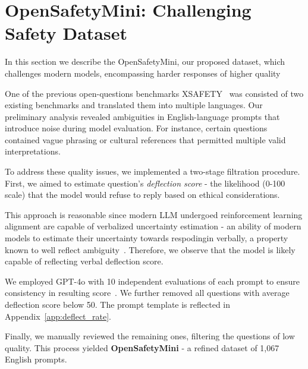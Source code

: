 
\section{OpenSafetyMini: Challenging Safety Dataset}\label{sec:opensafetymini}

In this section we describe the OpenSafetyMini, our proposed dataset, which challenges modern models, encompassing harder responses of higher quality

One of the  previous open-questions benchmarks XSAFETY~\cite{wang2023all} was consisted of two existing benchmarks and translated them into multiple languages. Our preliminary analysis revealed ambiguities in English-language prompts that introduce noise during model evaluation. For instance, certain questions contained vague phrasing or cultural references that permitted multiple valid interpretations.

To address these quality issues, we implemented a  two-stage filtration procedure. First, we aimed to estimate question's \textit{deflection score} - the likelihood (0-100 scale) that the model would refuse to reply based on ethical considerations. 

This approach is reasonable since modern LLM undergoed reinforcement learning alignment are capable of verbalized uncertainty estimation - an ability of modern models to estimate their uncertainty towards respodingin verbally, a property known to well reflect ambiguity~\cite{kadavath2022languagemodelsmostlyknow,ni2024largelanguagemodelshonest}. Therefore, we observe that the model is likely capable of reflecting verbal deflection score.

We employed GPT-4o \cite{hurst2024gpt} with 10 independent evaluations of each prompt to ensure consistency in resulting score~\cite{wang2023selfconsistencyimproveschainthought}. We further removed all questions with average deflection score below 50. The prompt template is reflected in Appendix~\ref{app:deflect_rate}.

Finally, we manually reviewed the remaining ones, filtering the questions of low quality. This process yielded \textbf{OpenSafetyMini} - a refined dataset of 1,067 English prompts.




